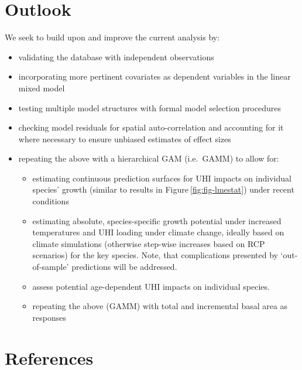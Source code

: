 \documentclass[
]{article}
\providecommand{\tightlist}{%
  \setlength{\itemsep}{0pt}\setlength{\parskip}{0pt}}
\begin{document}
\hypertarget{outlook}{%
\section{Outlook}\label{outlook}}

We seek to build upon and improve the current analysis by:

\begin{itemize}
\tightlist
\item
  validating the database with independent observations
\item
  incorporating more pertinent covariates as dependent variables in the linear mixed model\\
\item
  testing multiple model structures with formal model selection procedures
\item
  checking model residuals for spatial auto-correlation and accounting for it where necessary to ensure unbiased estimates of effect sizes
\item
  repeating the above with a hierarchical GAM (i.e.~GAMM) to allow for:

  \begin{itemize}
  \tightlist
  \item
    estimating continuous prediction surfaces for UHI impacts on individual species' growth (similar to results in Figure\(~\)\ref{fig:fig-lmestat}) under recent conditions
  \item
    estimating absolute, species-specific growth potential under increased temperatures and UHI loading under climate change, ideally based on climate simulations (otherwise step-wise increases based on RCP scenarios) for the key species. Note, that complications presented by `out-of-sample' predictions will be addressed.
  \item
    assess potential age-dependent UHI impacts on individual species.\\
  \item
    repeating the above (GAMM) with total and incremental basal area as responses
  \end{itemize}
\end{itemize}

\hypertarget{references}{%
\section{References}\label{references}}
\end{document}
